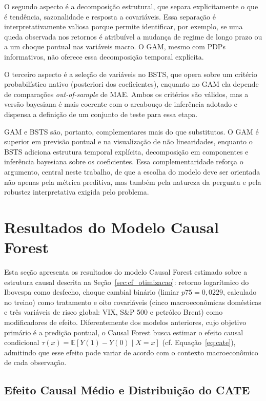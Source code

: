 \documentclass[	12pt, Times, openright, oneside, a4paper, english, brazil]{abntex2}
\begin{document}
O segundo aspecto é a decomposição estrutural, que separa explicitamente o que é tendência, sazonalidade e resposta a covariáveis. Essa separação é interpretativamente valiosa porque permite identificar, por exemplo, se uma queda observada nos retornos é atribuível a mudança de regime de longo prazo ou a um choque pontual nas variáveis macro. O GAM, mesmo com PDPs informativos, não oferece essa decomposição temporal explícita.

O terceiro aspecto é a seleção de variáveis no BSTS, que opera sobre um critério probabilístico nativo (posteriori dos coeficientes), enquanto no GAM ela depende de comparações \textit{out-of-sample} de MAE. Ambos os critérios são válidos, mas a versão bayesiana é mais coerente com o arcabouço de inferência adotado e dispensa a definição de um conjunto de teste para essa etapa.

GAM e BSTS são, portanto, complementares mais do que substitutos. O GAM é superior em previsão pontual e na visualização de não linearidades, enquanto o BSTS adiciona estrutura temporal explícita, decomposição em componentes e inferência bayesiana sobre os coeficientes. Essa complementaridade reforça o argumento, central neste trabalho, de que a escolha do modelo deve ser orientada não apenas pela métrica preditiva, mas também pela natureza da pergunta e pela robustez interpretativa exigida pelo problema.

\section{Resultados do Modelo Causal Forest}\label{sec:resultados_cf}

Esta seção apresenta os resultados do modelo Causal Forest estimado sobre a estrutura causal descrita na Seção~\ref{sec:cf_otimizacao}: retorno logarítmico do Ibovespa como desfecho, choque cambial binário (limiar $p75 = 0{,}0229$, calculado no treino) como tratamento e oito covariáveis (cinco macroeconômicas domésticas e três variáveis de risco global: VIX, S\&P 500 e petróleo Brent) como modificadores de efeito. Diferentemente dos modelos anteriores, cujo objetivo primário é a predição pontual, o Causal Forest busca estimar o efeito causal condicional $\tau(x) = \mathbb{E}[Y(1) - Y(0) \mid X = x]$ (cf. Equação~\ref{eq:cate}), admitindo que esse efeito pode variar de acordo com o contexto macroeconômico de cada observação.

\subsection{Efeito Causal Médio e Distribuição do CATE}
\end{document}
